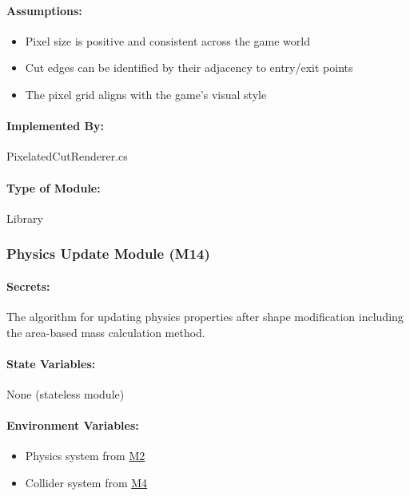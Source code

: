 \documentclass[12pt, titlepage]{article}
\begin{document}
\paragraph{Assumptions:}
\begin{itemize}
\item Pixel size is positive and consistent across the game world
\item Cut edges can be identified by their adjacency to entry/exit points
\item The pixel grid aligns with the game's visual style
\end{itemize}

\paragraph{Implemented By:}
PixelatedCutRenderer.cs

\paragraph{Type of Module:}
Library

\vspace{10mm}

\subsubsection{Physics Update Module (M14)} \label{M14}

\paragraph{Secrets:}
The algorithm for updating physics properties after shape modification including the area-based mass calculation method.

\paragraph{State Variables:}
None (stateless module)

\paragraph{Environment Variables:}
\begin{itemize}
\item Physics system from \hyperref[M2]{M2}
\item Collider system from \hyperref[M4]{M4}
\end{itemize}
\end{document}
